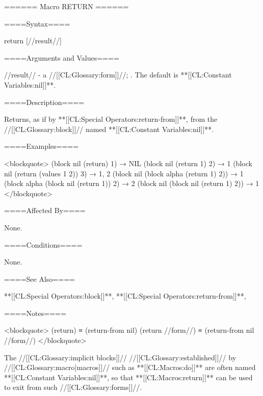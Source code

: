 ====== Macro RETURN ======

====Syntax====

\DefmacNoReturn return {[//result//]}

====Arguments and Values====

//result// - a //[[CL:Glossary:form]]//; \eval. The default is **[[CL:Constant Variables:nil]]**.

====Description====

Returns, as if by **[[CL:Special Operators:return-from]]**, from the //[[CL:Glossary:block]]// named **[[CL:Constant Variables:nil]]**.

====Examples====

<blockquote> (block nil (return) 1) → NIL (block nil (return 1) 2) → 1 (block nil (return (values 1 2)) 3) → 1, 2 (block nil (block alpha (return 1) 2)) → 1 (block alpha (block nil (return 1)) 2) → 2 (block nil (block nil (return 1) 2)) → 1 </blockquote>

====Affected By====

None.

====Conditions====

None.

====See Also====

**[[CL:Special Operators:block]]**, **[[CL:Special Operators:return-from]]**, {\secref\Evaluation}

====Notes====

<blockquote> (return) ≡ (return-from nil) (return //form//) ≡ (return-from nil //form//) </blockquote>

The //[[CL:Glossary:implicit blocks]]// //[[CL:Glossary:established]]// by //[[CL:Glossary:macro|macros]]// such as **[[CL:Macros:do]]** are often named **[[CL:Constant Variables:nil]]**, so that **[[CL:Macros:return]]** can be used to exit from such //[[CL:Glossary:forms]]//.

